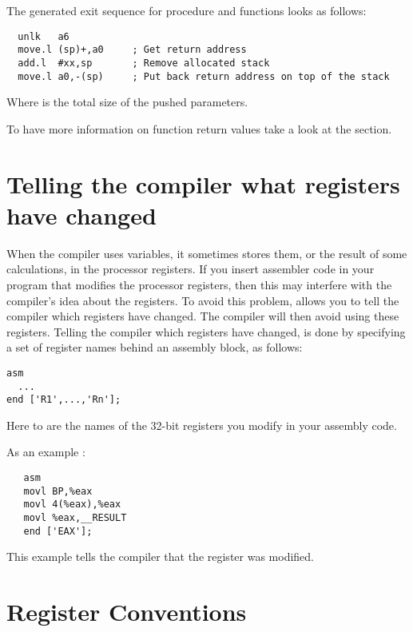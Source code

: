 \documentclass{report}
\begin{document}
The generated exit sequence for procedure and functions looks as follows:
\begin{verbatim}
  unlk   a6
  move.l (sp)+,a0     ; Get return address
  add.l  #xx,sp       ; Remove allocated stack
  move.l a0,-(sp)     ; Put back return address on top of the stack
\end{verbatim}

Where  is the total size of the pushed parameters.

To have more information on function return values take a look at the
 section.



\section{Telling the compiler what registers have changed}
\label{se:RegChanges}
When the compiler uses variables, it sometimes stores them, or the result of
some calculations, in the processor registers. If you insert assembler code
in your program that modifies the processor registers, then this may
interfere with the compiler's idea about the registers. To avoid this
problem, \fpc allows you to tell the compiler which registers have changed.
The compiler will then avoid using these registers. Telling the compiler
which registers have changed, is done by specifying a set of register names
behind an assembly block, as follows:
\begin{verbatim}
asm
  ...
end ['R1',...,'Rn'];
\end{verbatim}
Here  to  are the names of the 32-bit registers you
modify in your assembly code.

As an example :
\begin{verbatim}
   asm
   movl BP,%eax
   movl 4(%eax),%eax
   movl %eax,__RESULT
   end ['EAX'];
\end{verbatim}
This example tells the compiler that the  register was modified.

\section{Register Conventions}
\label{se:RegConvs}
\end{document}
